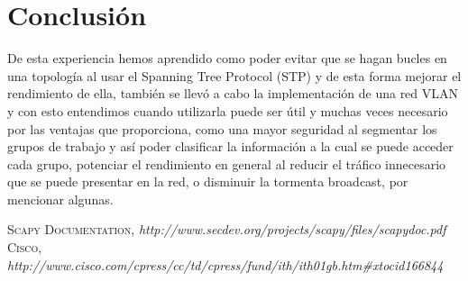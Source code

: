 \documentclass{udpreport}
\begin{document}
\chapter{Conclusión}
  	     De esta experiencia hemos aprendido como poder evitar que se hagan bucles en una topología al usar el Spanning Tree
  	     Protocol (STP) y de esta forma mejorar el rendimiento de ella, también se llevó a cabo la implementación de una red VLAN
  	     y con esto entendimos cuando utilizarla puede ser útil y muchas veces necesario por las ventajas que proporciona, como
  	     una mayor seguridad al segmentar los grupos de trabajo y así poder clasificar la información a la cual se puede acceder
  	     cada grupo, potenciar el rendimiento en general al reducir el tráfico innecesario que se puede presentar en la red, o
  	     disminuir la tormenta broadcast, por mencionar algunas.
  	      
\begin{thebibliography}{x}
 \textsc{Scapy Documentation},
\textit{http://www.secdev.org/projects/scapy/files/scapydoc.pdf}
 \textsc{Cisco},
\textit{ http://www.cisco.com/cpress/cc/td/cpress/fund/ith/ith01gb.htm#xtocid166844}
\end{thebibliography}
\end{document}
